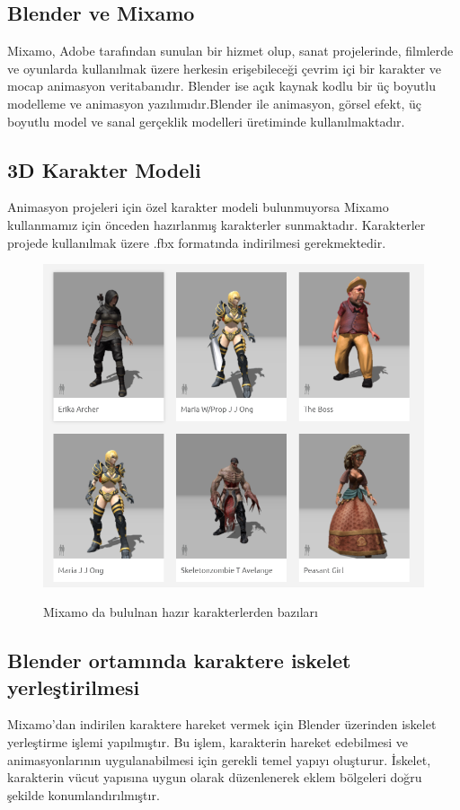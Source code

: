 \documentclass[12pt, a4paper]{article}
\begin{document}
\subsection{Blender ve Mixamo}

Mixamo, Adobe tarafından sunulan bir hizmet olup, sanat projelerinde, filmlerde ve oyunlarda kullanılmak üzere herkesin erişebileceği çevrim içi bir karakter ve mocap animasyon veritabanıdır.\cite{mixamo} Blender ise açık kaynak kodlu bir üç boyutlu modelleme ve animasyon yazılımıdır.Blender ile animasyon, görsel efekt, üç boyutlu model ve sanal gerçeklik modelleri üretiminde kullanılmaktadır.\cite{blender} 
\newline
\subsection{3D Karakter Modeli}
Animasyon projeleri için özel karakter modeli bulunmuyorsa Mixamo kullanmamız için  önceden  hazırlanmış karakterler sunmaktadır. Karakterler projede kullanılmak üzere .fbx formatında indirilmesi gerekmektedir.
\begin{figure}[h]
	\centering
	\includegraphics[width= 15 cm, height = 10 cm]{karakter.png}
	\caption{Mixamo da bululnan hazır karakterlerden bazıları} \cite{mixamo-2}
\end{figure}
\newpage
\subsection{Blender ortamında karaktere iskelet yerleştirilmesi}
Mixamo'dan indirilen karaktere hareket vermek için Blender üzerinden iskelet yerleştirme işlemi yapılmıştır. Bu işlem, karakterin hareket edebilmesi ve animasyonlarının uygulanabilmesi için gerekli temel yapıyı oluşturur. İskelet, karakterin vücut yapısına uygun olarak düzenlenerek  eklem bölgeleri doğru şekilde konumlandırılmıştır.
\end{document}
